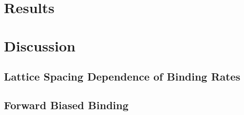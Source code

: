 \documentclass[11pt]{article}
\begin{document}
\begin{multicols}{2}
\section*{Results}


\section*{Discussion}

\subsection*{Lattice Spacing Dependence of Binding Rates}


\subsection*{Forward Biased Binding}


%

\end{multicols}
\end{document}
